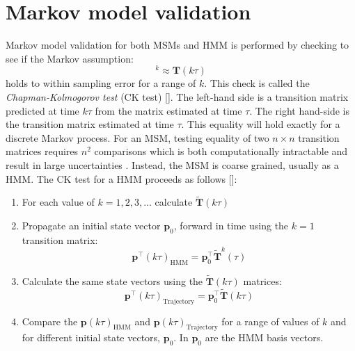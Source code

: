 \section{Markov model validation}\label{sec:model_validation}
Markov model validation for both MSMs and HMM is performed by checking to see if the Markov assumption: 
\begin{equation}
[\mathbf{T}(\tau)]^{k} \approx \mathbf{T}(k \tau)
\end{equation}
holds to within sampling error for a range of $k$. This check is called the \emph{Chapman-Kolmogorov test} (CK test) [].  The left-hand side is a transition matrix predicted at time $k\tau$ from the matrix estimated at time $\tau$. The right hand-side is the transition matrix estimated at time $\tau$. This equality will hold exactly for a discrete Markov process. For an MSM, testing equality of two $n \times n$ transition matrices requires $n^{2}$ comparisons which is both computationally intractable and result in large uncertainties \cite{prinzMarkovModelsMolecular2011}. Instead, the MSM is coarse grained, usually as a HMM. The CK test for a HMM proceeds as follows []:
\begin{enumerate}
    \item For each value of $k = 1, 2, 3, \ldots$ calculate $\widetilde{\mathbf{T}}(
    k\tau)$
    \item Propagate an initial  state vector $\mathbf{p}_{0}$, forward in time using the $k=1$ transition matrix:  
    \begin{equation*}
        \mathbf{p}^{\top}(k\tau)_{\mathrm{HMM}} = \mathbf{p}_{0}^{\top}\widetilde{\mathbf{T}}^{k}(\tau)
    \end{equation*}
    \item Calculate the same state vectors using the $\widetilde{\mathbf{T}}(
    k\tau)$ matrices: 
    \begin{equation*}
        \mathbf{p}^{\top}(k\tau)_{\mathrm{Trajectory}} = \mathbf{p}_{0}^{\top}\widetilde{\mathbf{T}}(k\tau)
    \end{equation*}
    \item Compare the $\mathbf{p}(k\tau)_{\mathrm{HMM}}$ and $\mathbf{p}(k\tau)_{\mathrm{Trajectory}}$ for a range of values of $k$ and for different initial state vectors, $\mathbf{p}_{0}$. In \cite{schererPyEMMASoftwarePackage2015a} $\mathbf{p}_{0}$ are the HMM basis vectors. 
\end{enumerate}

